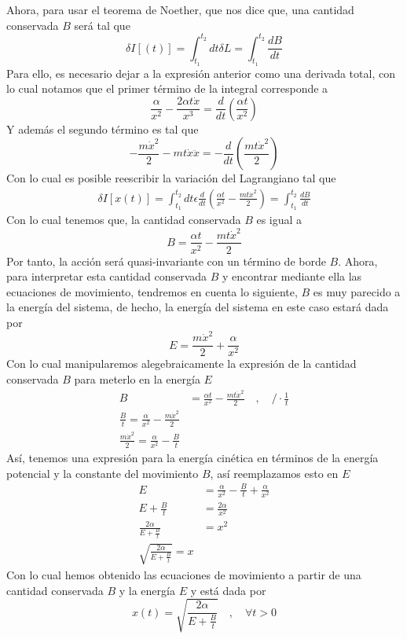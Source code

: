 \documentclass[../main_ej.tex]{subfiles}
\begin{document}
Ahora, para usar el teorema de Noether, que nos dice que, una cantidad conservada $B$ será tal que
\begin{equation}
  \delta I[(t)]=\int_{t_1}^{t_2} dt \delta L= \int_{t_1}^{t_2} \frac{dB}{dt} 
\end{equation}
Para ello, es necesario dejar a la expresión anterior como una derivada total, con lo cual notamos que el primer término de la integral corresponde a
\begin{equation*}
  \frac{\alpha}{x^2} - \frac{2\alpha t \dot{x}}{x^3} = \frac{d}{dt}\left( \frac{\alpha t}{x^2} \right)
\end{equation*}
Y además el segundo término es tal que
\begin{equation*}
  -\frac{m\dot{x}^2}{2} - mt\dot{x}\ddot{x} = -\frac{d}{dt}\left(\frac{mt\dot{x}^2}{2}\right)
\end{equation*}
 Con lo cual es posible reescribir la variación del Lagrangiano tal que
\begin{align*}
  \delta I[x(t)]=  \int_{t_1}^{t_2} dt \epsilon \frac{d}{dt}\left( \frac{\alpha t}{x^2}-\frac{mt\dot{x}^2}{2} \right) = \int_{t_1}^{t_2}\frac{dB}{dt}
\end{align*}
Con lo cual tenemos que, la cantidad  conservada $B$ es igual a 
\begin{equation}
  \boxed{ B = \frac{\alpha t}{x^2} - \frac{mt\dot{x}^2}{2}}
\end{equation}
Por tanto, la acción será quasi-invariante con un término de borde $B$. Ahora, para interpretar esta cantidad conservada $B$ y encontrar mediante ella las ecuaciones de movimiento, tendremos en cuenta lo siguiente, $B$ es muy parecido a la energía del sistema, de hecho, la energía del sistema en este caso estará dada por
\begin{equation*}
  E=\frac{m\dot{x}^2}{2}+\frac{\alpha}{x^2}
\end{equation*}
Con lo cual manipularemos alegebraicamente la expresión de la cantidad conservada $B$ para meterlo en la energía $E$ 
\begin{align*}
  B & = \frac{\alpha t}{x^2} - \frac{mt\dot{x}^2}{2} \quad, \quad /\cdot \frac{1}{t} \\  \frac{B}{t} =  \frac{\alpha}{x^2} - \frac{m\dot{x}^2}{2} \\
  \frac{m\dot{x}^2}{2} = \frac{\alpha}{x^2} - \frac{B}{t}
\end{align*}
Así, tenemos una expresión para la energía cinética en términos de la energía potencial y la constante del movimiento $B$, así reemplazamos esto en $E$
\begin{align*}
  E & = \frac{\alpha}{x^2} - \frac{B}{t} + \frac{\alpha}{x^2} \\
  E + \frac{B}{t} & = \frac{2\alpha}{x^2} \\
  \frac{2\alpha}{E + \frac{B}{t}} & = x^2 \\
  \sqrt{\frac{2\alpha}{E + \frac{B}{t}}} = x 
\end{align*}
Con lo cual hemos obtenido las ecuaciones de movimiento a partir de una cantidad conservada $B$ y la energía $E$ y está dada por
\begin{equation}
 \boxed{  x(t)=\sqrt{\frac{2\alpha}{E+\frac{B}{t}}} \quad , \quad \forall t>0 }
\end{equation}
\end{document}
